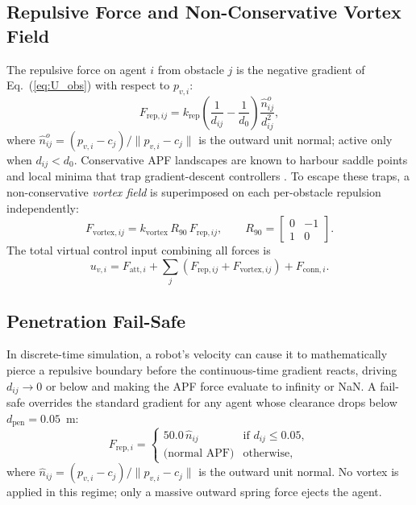 \documentclass[letterpaper, 10 pt, journal, twoside]{IEEEtran}
\newcommand{\eqnref}[1]{Eq.~(\ref{#1})}
\def\matt#1{\begin{bmatrix}#1\end{bmatrix}}
\begin{document}
\subsection{Repulsive Force and Non-Conservative Vortex Field}
The repulsive force on agent $i$ from obstacle $j$ is the negative gradient
of \eqnref{eq:U_obs} with respect to $p_{v,i}$:
\begin{equation}
  F_{\mathrm{rep},ij}=k_{\mathrm{rep}}
  \!\left(\frac{1}{d_{ij}}-\frac{1}{d_{0}}\right)\frac{\hat{n}_{ij}^{o}}{d_{ij}^{2}},
  \label{eq:Frep}
\end{equation}
where $\hat{n}_{ij}^{o}=(p_{v,i}-c_{j})/\|p_{v,i}-c_{j}\|$ is the outward
unit normal; active only when $d_{ij}<d_{0}$.  Conservative APF landscapes are known to harbour saddle points and local
minima that trap gradient-descent controllers \cite{rimon1992TRA,ge2000TRA}.
To escape these traps, a non-conservative \emph{vortex field} is
superimposed on each per-obstacle repulsion independently:
\begin{equation}
  F_{\mathrm{vortex},ij}=k_{\mathrm{vortex}}\,R_{90}\,F_{\mathrm{rep},ij},
  \qquad
  R_{90}=\matt{0&-1\\1&0}.
  \label{eq:Fvortex}
\end{equation}
The total virtual control input combining all forces is
\begin{equation}
  u_{v,i}=F_{\mathrm{att},i}
           +\sum_{j}(F_{\mathrm{rep},ij}+F_{\mathrm{vortex},ij})
           +F_{\mathrm{conn},i}.
  \label{eq:uvtotal}
\end{equation}

\subsection{Penetration Fail-Safe}
In discrete-time simulation, a robot's velocity can cause it to
mathematically pierce a repulsive boundary before the continuous-time
gradient reacts, driving $d_{ij}\to 0$ or below and making the APF
force evaluate to infinity or NaN.  A fail-safe overrides the standard
gradient for any agent whose clearance drops below $d_{\mathrm{pen}}=0.05$~m:
\begin{equation}
  F_{\mathrm{rep},i}=
  \begin{cases}
    50.0\,\hat{n}_{ij} & \text{if }d_{ij}\leq 0.05,\\
    \text{(normal APF)} & \text{otherwise,}
  \end{cases}
  \label{eq:failsafe}
\end{equation}
where $\hat{n}_{ij}=(p_{v,i}-c_{j})/\|p_{v,i}-c_{j}\|$ is the outward
unit normal.  No vortex is applied in this regime; only a massive
outward spring force ejects the agent.
\end{document}
